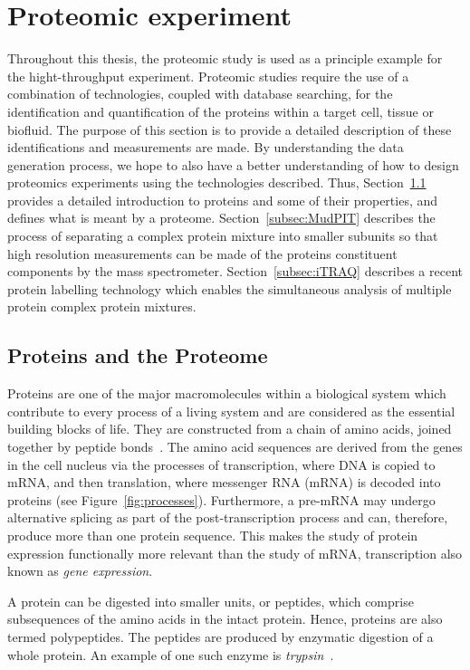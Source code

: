\documentclass[11pt,a4paper]{article}
\begin{document}
\section{Proteomic experiment}
\label{sec:proteomicExpt}
Throughout this thesis, the proteomic study is used as a principle example for the hight-throughput experiment. Proteomic studies require the use of a combination of technologies, coupled with database searching, for the identification and quantification of the proteins within a target cell, tissue or biofluid. The purpose of this section is to provide a detailed description of these identifications and measurements are made. By understanding the data generation process, we hope to also have a better understanding of how to design proteomics experiments using the technologies described. Thus, Section~\ref{subsec:protein} provides a detailed introduction to proteins and some of their properties, and defines what is meant by a proteome. Section~\ref{subsec:MudPIT} describes the process of separating a complex protein mixture into smaller subunits so that high resolution measurements can be made of the proteins constituent components by the mass spectrometer. Section~\ref{subsec:iTRAQ} describes a recent protein labelling technology which enables the simultaneous analysis of multiple protein complex protein mixtures. 

\subsection{Proteins and the Proteome}
\label{subsec:protein}
Proteins are one of the major macromolecules within a biological system which contribute to every process of a living system and are considered as the essential building blocks of life. They are constructed from a chain of amino acids, joined together by peptide bonds~\citep{Eidhammer2008}. The amino acid sequences are derived from the genes in the cell nucleus via the processes of transcription, where DNA is copied to mRNA, and then translation, where messenger RNA (mRNA) is decoded into proteins (see Figure~\ref{fig:processes}). Furthermore, a pre-mRNA may undergo alternative splicing as part of the post-transcription process and can, therefore, produce more than one protein sequence. This makes the study of protein expression functionally more relevant than the study of mRNA, transcription also known as \emph{gene expression}.

A protein can be digested into smaller units, or peptides, which comprise subsequences of the amino acids in the intact protein. Hence, proteins are also termed polypeptides. The peptides are produced by enzymatic digestion of a whole protein. An example of one such enzyme is \emph{trypsin}~\citep{Eidhammer2008}. 
\end{document}
